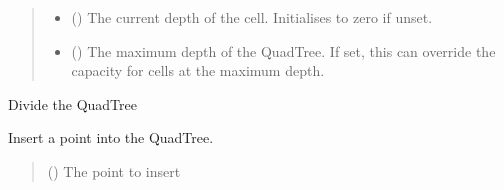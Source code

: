 \documentclass[letterpaper,10pt,english]{sphinxmanual}
\begin{document}
\begin{fulllineitems}
\begin{quote}
\begin{description}
\begin{itemize}
\item {}
\sphinxAtStartPar
{} () \textendash{} The current depth of the cell. Initialises to zero if unset.

\item {}
\sphinxAtStartPar
{} (\sphinxstyleliteralemphasis{\sphinxupquote{ | }}) \textendash{} The maximum depth of the QuadTree. If set, this can override the
capacity for cells at the maximum depth.

\end{itemize}

\end{description}\end{quote}

\begin{fulllineitems}
\label{\detokenize{quadtree:geotrees.quadtree.QuadTree.divide}}
\pysigstartsignatures
\pysiglinewithargsret
{}
{}
{}
\pysigstopsignatures
\sphinxAtStartPar
Divide the QuadTree
\begin{quote}\begin{description}
\sphinxAtStartPar
{}

\end{description}\end{quote}

\end{fulllineitems}


\begin{fulllineitems}
\label{\detokenize{quadtree:geotrees.quadtree.QuadTree.insert}}
\pysigstartsignatures
\pysiglinewithargsret
{}
{}
{}
\pysigstopsignatures
\sphinxAtStartPar
Insert a point into the QuadTree.
\begin{quote}\begin{description}
\sphinxAtStartPar
{} ({\hyperref[\detokenize{record:geotrees.record.Record}]{}}) \textendash{} The point to insert


\end{description}
\end{quote}
\end{fulllineitems}
\end{fulllineitems}
\end{document}
